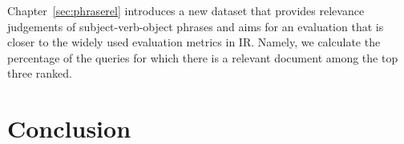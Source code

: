 Chapter~\ref{sec:phraserel} introduces a new dataset that provides relevance judgements of subject-verb-object phrases and aims for an evaluation that is closer to the widely used evaluation metrics in IR. Namely, we calculate the percentage of the queries for which there is a relevant document among the top three ranked.

\section{Conclusion}
\label{sec:conclusion-comp}



